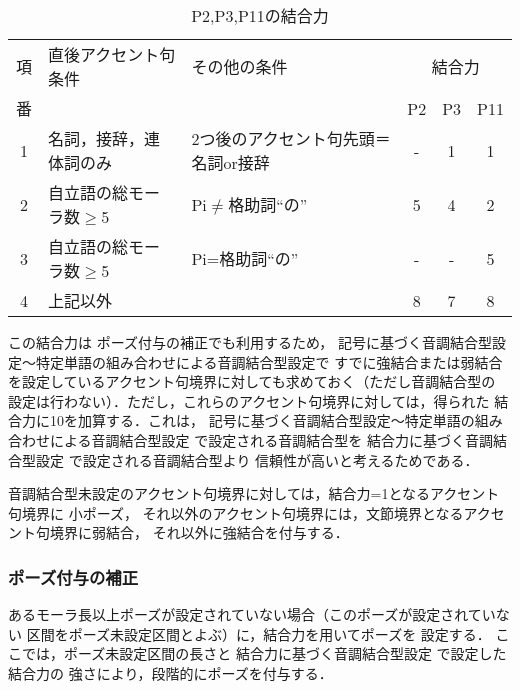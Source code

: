 \begin{table}
\caption{P2,P3,P11の結合力}
\label{tab:ketsugo2}
\begin{center}
\begin{tabular}{|c|l|l|c|c|c|}\hline
項  & 直後アクセント句条件  & その他の条件 & \multicolumn{3}{c|}{結合力} \\
\cline{4-6}
番  &                       &              & P2 & P3 & P11 \\ \hline
1 & 名詞，接辞，連体詞のみ & 2つ後のアクセント句先頭＝名詞or接辞 & - & 1 & 1 \\
2 & 自立語の総モーラ数$\geq$5 & Pi$\ne$格助詞``の''       & 5 & 4 & 2 \\
3 & 自立語の総モーラ数$\geq$5 & Pi=格助詞``の''           & - & - & 5 \\ \hline
4 & \multicolumn{2}{|l|}{上記以外}                        & 8 & 7 & 8 \\ \hline
\end{tabular}
\end{center}
\end{table}

この結合力は
ポーズ付与の補正でも利用するため，
記号に基づく音調結合型設定〜特定単語の組み合わせによる音調結合型設定で
すでに強結合または弱結合
を設定しているアクセント句境界に対しても求めておく（ただし音調結合型の
設定は行わない）．ただし，これらのアクセント句境界に対しては，得られた
結合力に10を加算する．これは，
記号に基づく音調結合型設定〜特定単語の組み合わせによる音調結合型設定
で設定される音調結合型を
結合力に基づく音調結合型設定
で設定される音調結合型より
信頼性が高いと考えるためである．

音調結合型未設定のアクセント句境界に対しては，結合力=1となるアクセント句境界に
小ポーズ，
それ以外のアクセント句境界には，文節境界となるアクセント句境界に弱結合，
それ以外に強結合を付与する．

\subsubsection{ポーズ付与の補正}\label{subsub:unpause}
あるモーラ長以上ポーズが設定されていない場合（このポーズが設定されていない
区間をポーズ未設定区間とよぶ）に，結合力を用いてポーズを
設定する．
ここでは，ポーズ未設定区間の長さと
結合力に基づく音調結合型設定
で設定した結合力の
強さにより，段階的にポーズを付与する．

